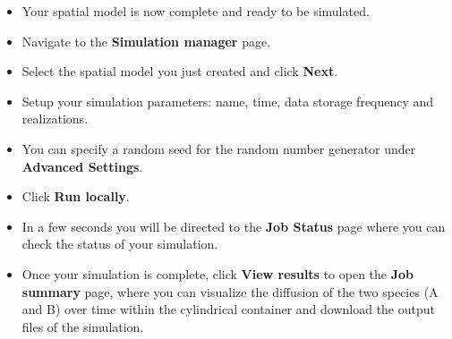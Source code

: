 \begin{itemize}
 
\item Your spatial model is now complete and ready to be simulated.

\item Navigate to the \textbf{Simulation manager} page.

\item Select the spatial model you just created and click \textbf{Next}.
\item Setup your simulation parameters: name, time, data storage frequency and realizations. 
\item You can specify a random seed for the random number generator under \textbf{Advanced Settings}.
\item Click \textbf{Run locally}.
\item In a few seconds you will be directed to the \textbf{Job Status} page where you can check the status of your simulation.
\item Once your simulation is complete, click \textbf{View results} to open the \textbf{Job summary} page, where you can visualize the diffusion of the two species (A and B) over time within the cylindrical container and download the output files of the simulation.

\end{itemize}



